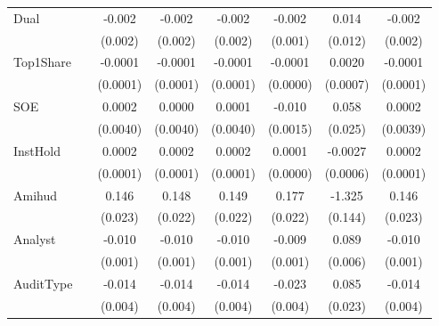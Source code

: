 \begin{table}[htbp]
\begin{tabular}{l*{7}{S}}
\addlinespace
Dual      &                  &   -0.002         &   -0.002         &   -0.002         &   -0.002\sym{**} &    0.014         &   -0.002         \\
          &                  &  (0.002)         &  (0.002)         &  (0.002)         &  (0.001)         &  (0.012)         &  (0.002)         \\
\addlinespace
Top1Share &                  &  -0.0001         &  -0.0001         &  -0.0001         &  -0.0001\sym{*}  &   0.0020\sym{***}&  -0.0001         \\
          &                  & (0.0001)         & (0.0001)         & (0.0001)         & (0.0000)         & (0.0007)         & (0.0001)         \\
\addlinespace
SOE       &                  &   0.0002         &   0.0000         &   0.0001         &  -0.010\sym{***} &   0.058\sym{**}  &   0.0002         \\
          &                  & (0.0040)         & (0.0040)         & (0.0040)         & (0.0015)         & (0.025)          & (0.0039)         \\
\addlinespace
InstHold  &                  &   0.0002\sym{**} &   0.0002\sym{***}&   0.0002\sym{***}&   0.0001\sym{***}&  -0.0027\sym{***}&   0.0002\sym{**} \\
          &                  & (0.0001)         & (0.0001)         & (0.0001)         & (0.0000)         & (0.0006)         & (0.0001)         \\
\addlinespace
Amihud    &                  &    0.146\sym{***}&    0.148\sym{***}&    0.149\sym{***}&    0.177\sym{***}&   -1.325\sym{***}&    0.146\sym{***}\\
          &                  &  (0.023)         &  (0.022)         &  (0.022)         &  (0.022)         &  (0.144)         &  (0.023)         \\
\addlinespace
Analyst   &                  &   -0.010\sym{***}&   -0.010\sym{***}&   -0.010\sym{***}&   -0.009\sym{***}&    0.089\sym{***}&   -0.010\sym{***}\\
          &                  &  (0.001)         &  (0.001)         &  (0.001)         &  (0.001)         &  (0.006)         &  (0.001)         \\
\addlinespace
AuditType &                  &   -0.014\sym{***}&   -0.014\sym{***}&   -0.014\sym{***}&   -0.023\sym{***}&    0.085\sym{***}&   -0.014\sym{***}\\
          &                  &  (0.004)         &  (0.004)         &  (0.004)         &  (0.004)         &  (0.023)         &  (0.004)         \\

\end{tabular}
\end{table}
